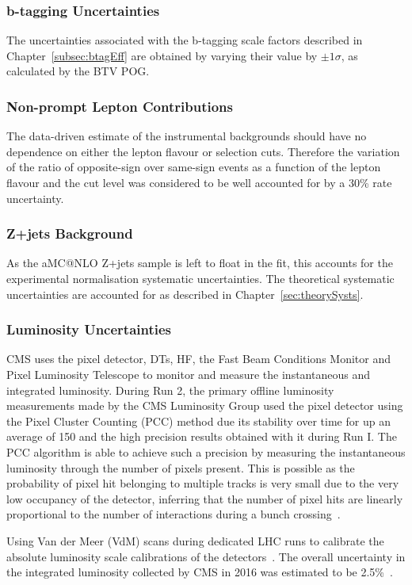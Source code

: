 \subsubsection{b-tagging Uncertainties}
The uncertainties associated with the b-tagging scale factors described in Chapter~\ref{subsec:btagEff} are obtained by varying their value by $\pm 1\sigma$, as calculated by the BTV POG.

\subsubsection{Non-prompt Lepton Contributions}
The data-driven estimate of the instrumental backgrounds should have no dependence on either the lepton flavour or selection cuts.
Therefore the variation of the ratio of opposite-sign over same-sign events as a function of the lepton flavour and the cut level was considered to be well accounted for by a 30\% rate uncertainty.

\subsubsection{Z+jets Background}
As the aMC@NLO Z+jets sample is left to float in the fit, this accounts for the experimental normalisation systematic uncertainties.
The theoretical systematic uncertainties are accounted for as described in Chapter~\ref{sec:theorySysts}.

\subsubsection{Luminosity Uncertainties}
CMS uses the pixel detector, DTs, HF, the Fast Beam Conditions Monitor and Pixel Luminosity Telescope to monitor and measure the instantaneous and integrated luminosity.
During Run 2, the primary offline luminosity measurements made by the CMS Luminosity Group used the pixel detector using the Pixel Cluster Counting (PCC) method due its stability over time for up an average \PU of 150 and the high precision results obtained with it during Run I.
The PCC algorithm is able to achieve such a precision by measuring the instantaneous luminosity through the number of pixels present. 
This is possible as the probability of pixel hit belonging to multiple tracks is very small due to the very low occupancy of the detector, inferring that the number of pixel hits are linearly proportional to the number of interactions during a bunch crossing~\cite{CMS:2017_lumi}.

Using Van der Meer (VdM) scans during dedicated LHC runs to calibrate the absolute luminosity scale calibrations of the detectors~\cite{vanderMeer:1968zz}.
The overall uncertainty in the integrated luminosity collected by CMS in 2016 was estimated to be 2.5\%~\cite{CMS:2017_lumi}.

